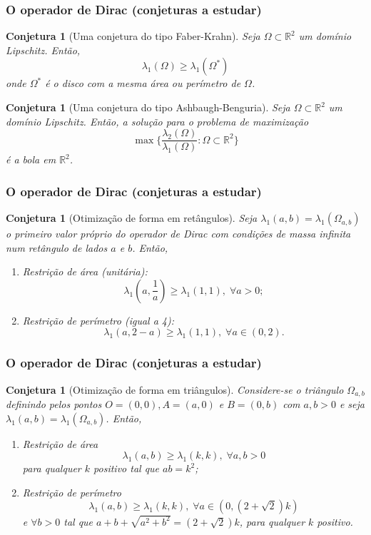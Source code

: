 \documentclass[portuguese,notheorems]{beamer}
\newtheorem{conjecture}[theorem]{Conjetura}
\begin{document}
\begin{frame}\frametitle{O operador de Dirac (conjeturas a estudar)}
    \begin{conjecture}[Uma conjetura do tipo Faber-Krahn]
        Seja \(\Omega \subset \mathbb{R}^2\) um domínio Lipschitz. Então,
    \[
    \lambda_1(\Omega) \geq \lambda_1(\Omega^\ast)
    \]
    onde \(\Omega^\ast\) é o disco com a mesma área ou perímetro de \(\Omega\).
\end{conjecture}
\pause
\begin{conjecture}[Uma conjetura do tipo Ashbaugh-Benguria]
    Seja \(\Omega \subset \mathbb{R}^2\) um domínio Lipschitz. Então, a solução para o problema de maximização
    \[
    \max \Big\{\frac{\lambda_2(\Omega)}{\lambda_1(\Omega)}: \Omega \subset \mathbb{R}^2\Big\}
    \]
    é a bola em \(\mathbb{R}^2\).
\end{conjecture}

\end{frame}

\begin{frame}\frametitle{O operador de Dirac (conjeturas a estudar)}
    \begin{conjecture}[Otimização de forma em retângulos]
        Seja \(\lambda_1(a, b) = \lambda_1(\Omega_{a, b})\) o primeiro valor próprio do operador de Dirac com condições de massa infinita num retângulo de lados \(a\) e \(b\). Então,
        \begin{enumerate}
            \item \label{david_conjectures_1} \textit{Restrição de área (unitária): } \[\lambda_1(a, \frac{1}{a}) \geq \lambda_1(1, 1), \; \forall a>0; \]
            \item  \label{david_conjectures_2} \textit{Restrição de perímetro (igual a 4): } \[\lambda_1(a, 2-a) \geq \lambda_1(1, 1), \; \forall a\in (0, 2).\]
        \end{enumerate}
    \end{conjecture}
\end{frame}


\begin{frame}\frametitle{O operador de Dirac (conjeturas a estudar)}
    \begin{conjecture}[Otimização de forma em triângulos]
        Considere-se o triângulo \(\Omega_{a, b}\) definindo pelos pontos \(O=(0, 0), A=(a, 0)\) e \(B=(0, b)\) com \(a, b>0\) e seja \(\lambda_1(a, b) = \lambda_1(\Omega_{a, b})\). Então,
        \begin{enumerate}
        \item \textit{Restrição de área } \[\lambda_1(a, b) \geq \lambda_1(k, k),\; \forall a, b>0\] para qualquer \(k\) positivo tal que \(ab=k^2\);
        \item \textit{Restrição de perímetro } \[\lambda_1(a, b) \geq \lambda_1(k, k),\; \forall a \in (0, (2+\sqrt{2})k)\] e \(\forall b > 0\) tal que \(a+b+\sqrt{a^2+b^2}=(2+\sqrt{2})k\), para qualquer \(k\) positivo.
        \end{enumerate}
    \end{conjecture}
\end{frame}
\end{document}
